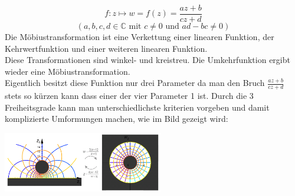  \begin{minipage}{10cm}
    $$ f : z \mapsto w = f(z) = \frac{az + b}{cz + d}$$
    $$(a, b, c, d \in 
    \mathbb{C} \text{ mit } c \neq 0 \text{ und } ad - bc \neq 0) $$
    Die Möbiustransformation ist eine Verkettung einer linearen Funktion, der Kehrwertfunktion und einer weiteren linearen Funktion. \\
    Diese Transformationen sind winkel- und kreistreu. Die Umkehrfunktion ergibt wieder eine Möbiustransformation. \\
    Eigentlich besitzt diese Funktion nur drei Parameter da man den Bruch
    $\frac{az + b}{cz + d}$ stets so kürzen kann dass einer der vier Parameter 1
    ist. Durch die 3 Freiheitsgrade kann man unterschiedlichste kriterien
    vorgeben und damit komplizierte Umformungen machen, wie im Bild gezeigt wird:
  
  \end{minipage}
  \hspace{2cm}
  \begin{minipage}{7cm}
    \includegraphics[width=7cm]{./bilder/Moebiustransformation.png} 
  \end{minipage}

